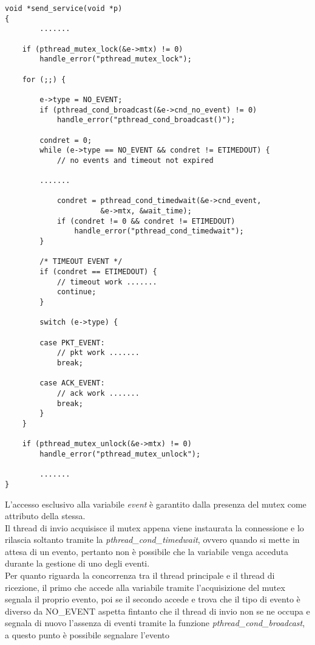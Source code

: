 \begin{lstlisting}[title=transport.c]
void *send_service(void *p)
{
		.......

    if (pthread_mutex_lock(&e->mtx) != 0)
        handle_error("pthread_mutex_lock");

    for (;;) {

        e->type = NO_EVENT;
        if (pthread_cond_broadcast(&e->cnd_no_event) != 0)
            handle_error("pthread_cond_broadcast()");

        condret = 0;
        while (e->type == NO_EVENT && condret != ETIMEDOUT) {
            // no events and timeout not expired

		.......

            condret = pthread_cond_timedwait(&e->cnd_event,
                      &e->mtx, &wait_time);
            if (condret != 0 && condret != ETIMEDOUT)
                handle_error("pthread_cond_timedwait");
        }

        /* TIMEOUT EVENT */
        if (condret == ETIMEDOUT) {
            // timeout work .......
            continue;
        }

        switch (e->type) {

        case PKT_EVENT:
            // pkt work .......
            break;

        case ACK_EVENT:
            // ack work .......
            break;
        }
    }

    if (pthread_mutex_unlock(&e->mtx) != 0)
        handle_error("pthread_mutex_unlock");

		.......
}
\end{lstlisting}
%
L'accesso esclusivo alla variabile \emph{event} è garantito dalla presenza
del mutex come attributo della stessa.\\
Il thread di invio acquisisce il mutex appena viene instaurata la connessione
e lo rilascia soltanto tramite la \emph{pthread\_cond\_timedwait}, ovvero
quando si mette in attesa di un evento, pertanto non è possibile che la 
variabile venga acceduta durante la gestione di uno degli eventi.\\
Per quanto riguarda la concorrenza tra il thread principale e il thread di
ricezione, il primo che accede alla variabile tramite l'acquisizione del
mutex segnala il proprio evento, poi se il secondo accede e trova che il tipo
di evento è diverso da NO\_EVENT aspetta fintanto che il thread di invio 
non se ne occupa e segnala di nuovo l'assenza di eventi tramite la funzione
\emph{pthread\_cond\_broadcast}, a questo punto è possibile segnalare l'evento
